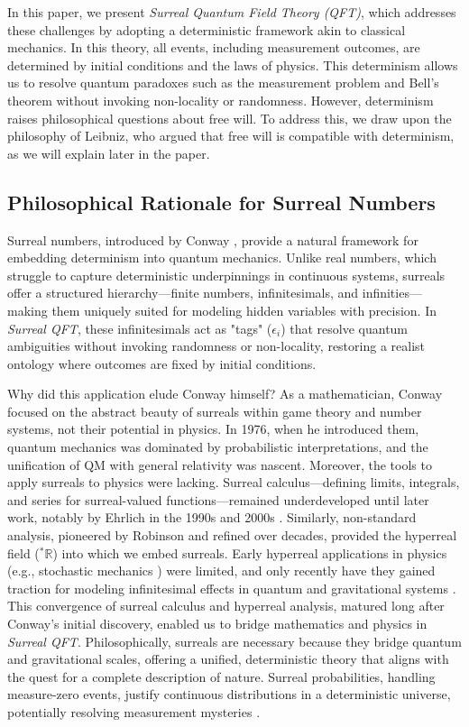 \documentclass{article}
\begin{document}
In this paper, we present \textit{Surreal Quantum Field Theory (QFT)}, which addresses these challenges by adopting a deterministic framework akin to classical mechanics. In this theory, all events, including measurement outcomes, are determined by initial conditions and the laws of physics. This determinism allows us to resolve quantum paradoxes such as the measurement problem and Bell's theorem without invoking non-locality or randomness. However, determinism raises philosophical questions about free will. To address this, we draw upon the philosophy of Leibniz, who argued that free will is compatible with determinism, as we will explain later in the paper.

\subsection{Philosophical Rationale for Surreal Numbers}
Surreal numbers, introduced by Conway \cite{Conway1976}, provide a natural framework for embedding determinism into quantum mechanics. Unlike real numbers, which struggle to capture deterministic underpinnings in continuous systems, surreals offer a structured hierarchy---finite numbers, infinitesimals, and infinities---making them uniquely suited for modeling hidden variables with precision. In \textit{Surreal QFT}, these infinitesimals act as "tags" (\(\epsilon_i\)) that resolve quantum ambiguities without invoking randomness or non-locality, restoring a realist ontology where outcomes are fixed by initial conditions.

Why did this application elude Conway himself? As a mathematician, Conway focused on the abstract beauty of surreals within game theory and number systems, not their potential in physics. In 1976, when he introduced them, quantum mechanics was dominated by probabilistic interpretations, and the unification of QM with general relativity was nascent. Moreover, the tools to apply surreals to physics were lacking. Surreal calculus---defining limits, integrals, and series for surreal-valued functions---remained underdeveloped until later work, notably by Ehrlich in the 1990s and 2000s \cite{Ehrlich2012}. Similarly, non-standard analysis, pioneered by Robinson \cite{Robinson1966} and refined over decades, provided the hyperreal field (\({}^*\mathbb{R}\)) into which we embed surreals. Early hyperreal applications in physics (e.g., stochastic mechanics \cite{Albeverio1986}) were limited, and only recently have they gained traction for modeling infinitesimal effects in quantum and gravitational systems \cite{Goldblatt1998}. This convergence of surreal calculus and hyperreal analysis, matured long after Conway's initial discovery, enabled us to bridge mathematics and physics in \textit{Surreal QFT}. Philosophically, surreals are necessary because they bridge quantum and gravitational scales, offering a unified, deterministic theory that aligns with the quest for a complete description of nature. Surreal probabilities, handling measure-zero events, justify continuous distributions in a deterministic universe, potentially resolving measurement mysteries \cite{Pruss2010}.
\end{document}
